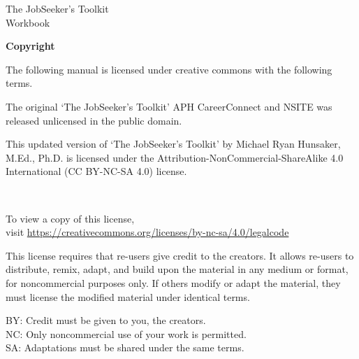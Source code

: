 \documentclass[11pt, letterpaper, twoside]{book}
\begin{document}
\mbox{}






\extramarks{ }{ }
\clearpage
\mbox{}
\vfill{}
\begin{center}
{\Huge The JobSeeker's Toolkit \\ \vspace{0.5cm} Workbook}
\end{center}
\mbox{}
\vfill{}
\clearpage

\mbox{}

\vfill

	\textbf{Copyright}
	\bigskip
		
	The following manual is licensed under creative commons with the following terms.
		
	\bigskip
		
	The original `The JobSeeker's Toolkit' APH CareerConnect and NSITE was released unlicensed in the public domain. 
 
    This updated version of `The JobSeeker's Toolkit' by Michael Ryan Hunsaker, M.Ed., Ph.D. is licensed under the Attribution-NonCommercial-ShareAlike 4.0 International (CC BY-NC-SA 4.0) license.
		
	\bigskip
		
	\ccbyncsa\
		
	\bigskip
		
	To view a copy of this license, \\
	visit \href{https://creativecommons.org/licenses/by-nc-sa/4.0/legalcode}{https://creativecommons.org/licenses/by-nc-sa/4.0/legalcode}
		
	\bigskip
		
	This license requires that re-users give credit to the creators. It allows re-users to distribute, remix, adapt, and build upon the material in any medium or format, for noncommercial purposes only. If others modify or adapt the material, they must license the modified material under identical terms.
		
	\bigskip
		
	BY: Credit must be given to you, the creators. \\
	NC: Only noncommercial use of your work is permitted. \\
	SA: Adaptations must be shared under the same terms.

\makeatother \clearpage
{}





\end{document}

